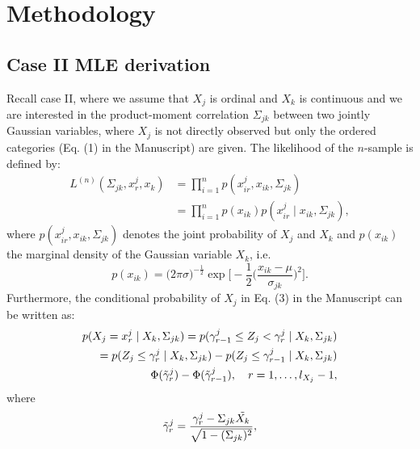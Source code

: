 
\section{Methodology}
\subsection{Case II MLE derivation}

Recall case II, where we assume that $X_j$ is ordinal and $X_k$ is continuous and we are interested in the product-moment correlation $\Sigma_{jk}$ between two jointly Gaussian variables, where $X_j$ is not directly observed but only the ordered categories (Eq. (1) in the Manuscript) 
are given. The likelihood of the $n$-sample is defined by:
\begin{equation}\label{polyserial_likelihood_appendix}
    \begin{split}
        L^{(n)}(\Sigma_{jk}, x^j_r,x_k) &= \prod_{i=1}^n p(x^j_{ir},x_{ik}, \Sigma_{jk}) \\
        &= \prod_{i=1}^n p(x_{ik})p(x^j_{ir} \mid x_{ik}, \Sigma_{jk}),
    \end{split}
\end{equation}
where $p(x^j_{ir},x_{ik}, \Sigma_{jk})$ denotes the joint probability of  $X_j$ and $X_k$ and $p(x_{ik})$ the marginal density of the Gaussian variable $X_k$, i.e.  
\begin{equation*}\label{marginal_normal}
    p(x_{ik}) = \big(2\pi\sigma\big)^{-\frac{1}{2}} \exp\Bigg[-\frac{1}{2}\bigg(\frac{x_{ik} - \mu}{\sigma_{jk}}\bigg)^2\Bigg].
\end{equation*}
Furthermore, the conditional probability of $X_j$ in Eq. %
(3) in the Manuscript can be written as:
\begin{equation}\label{threshold_conditionalprob}
    \begin{split}
        p(X_j = x^j_r \mid X_k, \Sigma_{jk}) = p(\gamma^j_{r-1} \leq Z_j < \gamma^j_r \mid X_k, \Sigma_{jk}) \\
        = p(Z_j \leq \gamma^j_{r} \mid X_k, \Sigma_{jk}) - p(Z_j \leq \gamma^j_{r-1} \mid X_k, \Sigma_{jk}) \\
        \Phi(\Tilde{\gamma}^j_{r}) - \Phi(\Tilde{\gamma}^j_{r-1}), \quad r = 1, \dots, l_{X_j} -1,
    \end{split}
\end{equation}
where
\begin{equation*}
    \Tilde{\gamma}^j_{r} = \frac{\gamma^j_{r} - \Sigma_{jk}\Tilde{X_k} }{\sqrt{1-(\Sigma_{jk})^2}}, 
\end{equation*}
